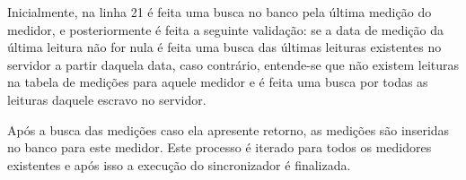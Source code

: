 
\newpage

Inicialmente, na linha 21 é feita uma busca no banco pela última medição do medidor, e posteriormente é feita a seguinte validação: se a data de medição da última leitura não for nula é feita uma busca das últimas leituras existentes no servidor a partir daquela data, caso contrário, entende-se que não existem leituras na tabela de medições para aquele medidor e é feita uma busca por todas as leituras daquele escravo no servidor. 

Após a busca das medições caso ela apresente retorno, as medições são inseridas no banco para este medidor. Este processo é iterado para todos os medidores existentes e após isso a execução do sincronizador é finalizada.